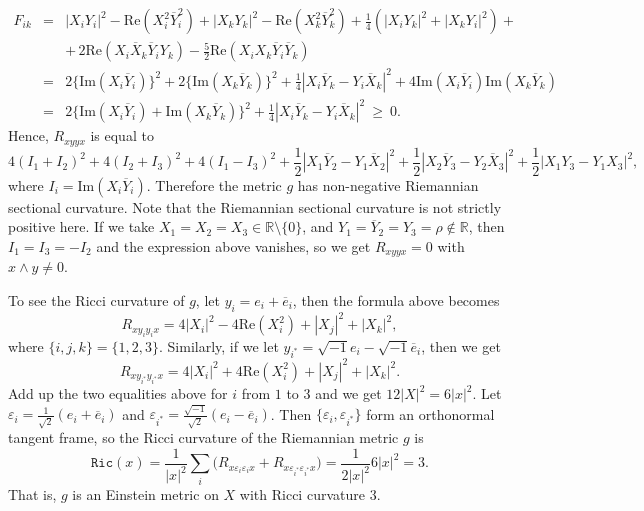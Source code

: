 \documentclass{amsart}
\numberwithin{equation}{section}
\theoremstyle{definition}
\renewcommand{\1}{\mathds{1}}
\renewcommand{\>}{\rightarrow}
\begin{document}
\begin{eqnarray*}
F_{ik} & = & |X_iY_i|^2 - \mbox{Re} (X_i^2\overline{Y}_i^2) + |X_kY_k|^2 - \mbox{Re} (X_k^2\overline{Y}_k^2)
+ \frac{1}{4}(|X_iY_k|^2 + |X_kY_i|^2) + \\
&& + \,  2\mbox{Re} (X_i\overline{X}_k \overline{Y}_i Y_k ) - \frac{5}{2} \mbox{Re} (X_iX_k\overline{Y}_i \overline{Y}_k )\\
& = & 2\{\mbox{Im}(X_i\overline{Y}_i)\}^2 + 2\{\mbox{Im}(X_k\overline{Y}_k)\}^2 + \frac{1}{4} |X_i\overline{Y}_k - Y_i\overline{X}_k |^2 + 4 \mbox{Im}(X_i\overline{Y}_i)\mbox{Im}(X_k\overline{Y}_k) \\
& = & 2 \{ \mbox{Im}(X_i\overline{Y}_i) + \mbox{Im}(X_k\overline{Y}_k) \}^2 + \frac{1}{4} |X_i\overline{Y}_k - Y_i\overline{X}_k |^2 \ \geq \ 0.
\end{eqnarray*}
Hence, $R_{xyyx}$ is equal to
\begin{equation*}
4(I_1+I_2)^2+4(I_2+I_3)^2 + 4(I_1-I_3)^2 +\frac{1}{2}|X_1\overline{Y}_2-Y_1\overline{X}_2|^2 +\frac{1}{2}|X_2\overline{Y}_3-Y_2\overline{X}_3|^2 +\frac{1}{2}|X_1Y_3-Y_1X_3|^2,
\end{equation*}
where $I_i=\mbox{Im}(X_i\overline{Y}_i)$. Therefore the metric $g$ has  non-negative Riemannian sectional curvature. Note that the Riemannian sectional curvature is not strictly positive here. If we take $X_1=X_2=X_3\in {\mathbb R}\setminus \{ 0\}$, and $Y_1=\overline{Y}_2=Y_3=\rho \not\in {\mathbb R}$, then $I_1=I_3=-I_2$ and the expression above vanishes, so we get $R_{xyyx}=0$ with $x\wedge y\neq 0$.

To see the Ricci curvature of $g$, let $y_i=e_i+\overline{e}_i$, then the formula above becomes
$$ R_{x y_i y_i x} = 4|X_i|^2 - 4\mbox{Re}(X_i^2) +  |X_j|^2 +  |X_k|^2,$$
where $\{ i,j,k\} =\{ 1,2,3\}$. Similarly, if we let $y_{i^{\ast}}=\sqrt{-1}e_i-\sqrt{-1}\overline{e}_i$, then we get
$$ R_{xy_{i^{\ast}} y_{i^{\ast}} x} = 4|X_i|^2 + 4\mbox{Re}(X_i^2) +  |X_j|^2 +  |X_k|^2.$$
Add up the two equalities above for $i$ from $1$ to $3$ and we get $12|X|^2=6|x|^2$. Let $\varepsilon_i = \frac{1}{\sqrt{2}}(e_i+\overline{e}_i)$ and  $\varepsilon_{i^{\ast}} = \frac{\sqrt{-1}}{\sqrt{2}}(e_i-\overline{e}_i)$. Then $\{ \varepsilon_i, \varepsilon_{i^{\ast}}\}$ form an orthonormal tangent frame, so the Ricci curvature of the Riemannian metric $g$ is
\begin{equation}
\mathtt{Ric}(x) = \frac{1}{|x|^2} \sum_i \big( R_{x\varepsilon_i\varepsilon_ix} + R_{x\varepsilon_{i^{\ast}}\varepsilon_{i^{\ast}}x} \big)= \frac{1}{2|x|^2} 6|x|^2 = 3.
\end{equation}
That is, $g$ is an Einstein metric on $X$ with Ricci curvature $3$.
\end{document}
